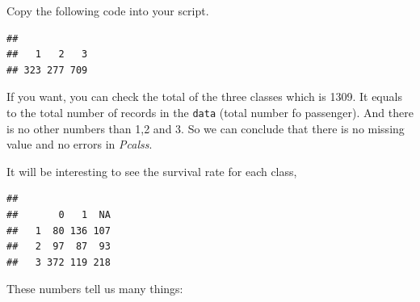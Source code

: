 \documentclass[
]{book}
\newenvironment{Shaded}{\begin{snugshade}}{\end{snugshade}}
\newcommand{\CommentTok}[1]{\textcolor[rgb]{0.56,0.35,0.01}{\textit{#1}}}
\newcommand{\KeywordTok}[1]{\textcolor[rgb]{0.13,0.29,0.53}{\textbf{#1}}}
\newcommand{\NormalTok}[1]{#1}
\newcommand{\OperatorTok}[1]{\textcolor[rgb]{0.81,0.36,0.00}{\textbf{#1}}}
\newcommand{\StringTok}[1]{\textcolor[rgb]{0.31,0.60,0.02}{#1}}
\begin{document}
Copy the following code into your script.

\begin{Shaded}
\end{Shaded}

\begin{verbatim}
## 
##   1   2   3 
## 323 277 709
\end{verbatim}

If you want, you can check the total of the three classes which is 1309. It equals to the total number of records in the \texttt{data} (total number fo passenger). And there is no other numbers than 1,2 and 3. So we can conclude that there is no missing value and no errors in \emph{Pcalss}.

It will be interesting to see the survival rate for each class,

\begin{Shaded}
\end{Shaded}

\begin{verbatim}
##    
##       0   1  NA
##   1  80 136 107
##   2  97  87  93
##   3 372 119 218
\end{verbatim}

These numbers tell us many things:
\end{document}
